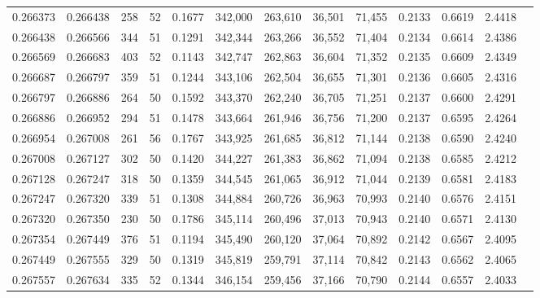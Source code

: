 \begin{tabular}{rrrrrrrrrrrrr}
0.266373 & 0.266438 &   258 &  52 &                                     0.1677 & 342,000 & 263,610 &  36,501 &  71,455 & 0.2133 & 0.6619 & 2.4418 \\
0.266438 & 0.266566 &   344 &  51 &                                     0.1291 & 342,344 & 263,266 &  36,552 &  71,404 & 0.2134 & 0.6614 & 2.4386 \\
0.266569 & 0.266683 &   403 &  52 &                                     0.1143 & 342,747 & 262,863 &  36,604 &  71,352 & 0.2135 & 0.6609 & 2.4349 \\
0.266687 & 0.266797 &   359 &  51 &                                     0.1244 & 343,106 & 262,504 &  36,655 &  71,301 & 0.2136 & 0.6605 & 2.4316 \\
0.266797 & 0.266886 &   264 &  50 &                                     0.1592 & 343,370 & 262,240 &  36,705 &  71,251 & 0.2137 & 0.6600 & 2.4291 \\
0.266886 & 0.266952 &   294 &  51 &                                     0.1478 & 343,664 & 261,946 &  36,756 &  71,200 & 0.2137 & 0.6595 & 2.4264 \\
0.266954 & 0.267008 &   261 &  56 &                                     0.1767 & 343,925 & 261,685 &  36,812 &  71,144 & 0.2138 & 0.6590 & 2.4240 \\
0.267008 & 0.267127 &   302 &  50 &                                     0.1420 & 344,227 & 261,383 &  36,862 &  71,094 & 0.2138 & 0.6585 & 2.4212 \\
0.267128 & 0.267247 &   318 &  50 &                                     0.1359 & 344,545 & 261,065 &  36,912 &  71,044 & 0.2139 & 0.6581 & 2.4183 \\
0.267247 & 0.267320 &   339 &  51 &                                     0.1308 & 344,884 & 260,726 &  36,963 &  70,993 & 0.2140 & 0.6576 & 2.4151 \\
0.267320 & 0.267350 &   230 &  50 &                                     0.1786 & 345,114 & 260,496 &  37,013 &  70,943 & 0.2140 & 0.6571 & 2.4130 \\
0.267354 & 0.267449 &   376 &  51 &                                     0.1194 & 345,490 & 260,120 &  37,064 &  70,892 & 0.2142 & 0.6567 & 2.4095 \\
0.267449 & 0.267555 &   329 &  50 &                                     0.1319 & 345,819 & 259,791 &  37,114 &  70,842 & 0.2143 & 0.6562 & 2.4065 \\
0.267557 & 0.267634 &   335 &  52 &                                     0.1344 & 346,154 & 259,456 &  37,166 &  70,790 & 0.2144 & 0.6557 & 2.4033 \\

\end{tabular}
